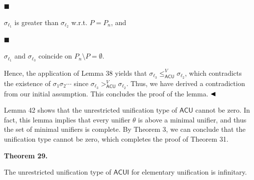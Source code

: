 \documentclass[10pt,a4paper]{amsart}
\begin{document}
 
\par\noindent  $\blacksquare$ 
 
$\sigma_{\ell_{1}}$ is greater than $\sigma_{\ell_{2}}$ w.r.t. $P=P_{n}$, and\par
 
 
 
\par\noindent  $\blacksquare$ 
 
$\sigma_{\ell_{1}}$ and $\sigma_{\ell_{3}}$ coincide on $P_{n}\setminus P=\emptyset$.\par
 
 
  
Hence, the application of Lemma 38 yields that $\sigma_{\ell_{3}}\leq_{\mathsf{ACU}}^{V}\sigma_{\ell_{2}}$, which contradicts the existence of $\sigma_{1}\sigma_{2}\cdots$ since $\sigma_{\ell_{3}}>_{\mathsf{ACU}}^{V}\sigma_{\ell_{2}}$. Thus, we have derived a contradiction from our initial assumption. This concludes the proof of the lemma. $\hfill\blacktriangleleft$\par
 
 
 
Lemma 42 shows that the unrestricted unification type of $\mathsf{ACU}$ cannot be zero. In fact, this lemma implies that every unifier $\theta$ is above a minimal unifier, and thus the set of minimal unifiers is complete. By Theorem 3, we can conclude that the unification type cannot be zero, which completes the proof of Theorem 31.\par
 
 
 
\par
 
 
 

 
\par\medskip\noindent\textbf{Theorem 29.}\par
 
 
The unrestricted unification type of $\mathsf{ACUI}$ for elementary unification is infinitary.\par
 
\end{document}
